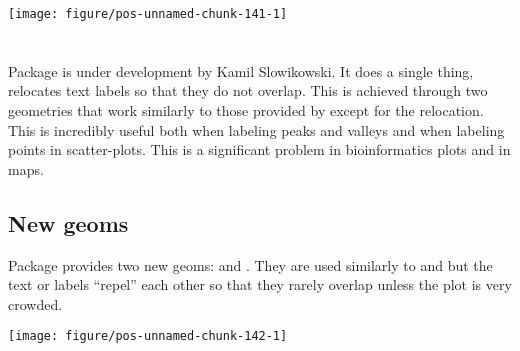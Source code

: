 \documentclass[paper=a4,10pt,div=17,headsepline,BCOR=12mm,twoside,open=right]{scrbook}\usepackage{knitr}
\begin{document}
\begin{knitrout}\footnotesize
{}\color{fgcolor}\begin{kframe}
\begin{alltt}
\hlopt{$} \hlkwb{<-} \hlopt{$} \hlopt{>=} \hlstd{,} \hlstd{,} \hlstd{)}
    \hlopt{+}
  \hlstd{()} \hlopt{+}
  \hlstd{(} \hlstd{=} \hlstd{,}  \hlstd{=} \hlstd{(}\hlstd{))}
\end{alltt}
\end{kframe}

{\centering \texttt{[image: figure/pos-unnamed-chunk-141-1]} 

}



\end{knitrout}

\section[ggrepel]{\ggrepel}

Package \ggrepel is under development by Kamil Slowikowski. It does a single
thing, relocates text labels so that they do not overlap. This is achieved through
two geometries that work similarly to those provided by \ggplot except for the
relocation. This is incredibly useful both when labeling peaks and valleys and when
labeling points in scatter-plots. This is a significant problem in bioinformatics
plots and in maps.

\subsection{New geoms}

Package \ggrepel provides two new geoms:  and . They are used similarly to  and  but the text or labels ``repel'' each other so that they rarely overlap unless the plot is very crowded.

\begin{knitrout}\footnotesize
{}\color{fgcolor}\begin{kframe}
\begin{alltt}
  \hlopt{+}
  \hlstd{()} \hlopt{+}
  \hlstd{(} \hlstd{=} \hlstd{,}  \hlstd{=} \hlstd{)}
\end{alltt}
\end{kframe}

{\centering \texttt{[image: figure/pos-unnamed-chunk-142-1]} 

}



\end{knitrout}
\end{document}
